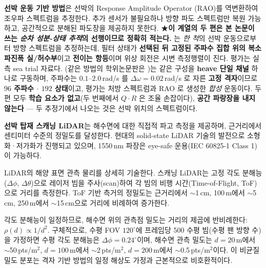 \documentclass[11pt]{report}
\numberwithin{equation}{chapter}
\numberwithin{figure}{chapter}
\numberwithin{table}{chapter}
\begin{document}
\textbf{선박 운동 기반 방법}은 선박의 Response Amplitude Operator (RAO)를
역변환하여 조우파 스펙트럼을 추정한다.
추가 센서가 불필요하나 방향 파도 스펙트럼만 복원 가능하고,
공간적으로 분해된 파도장을 제공하지 못한다.
★\textbf{이 계열의 두 편은 본 논문이 쓰는 \emph{순차 성분-상태 추적}의 선행이므로
정확히 적는다.} \citet{Pascoal2017DirSpectra} 는 \emph{한 척}의 선박 운동으로부터
방향 스펙트럼을 추정하는데, 필터 상태가 \textbf{선택된 뒤 고정된 주파수 집합 위의 복소
파진폭 실/허수부}이고 \textbf{전이는 항등}이며 위상 회전은 시변 측정행렬이 진다.
평가는 실측 sea trial 자료다. \citet{Kim2019InverseKF}(같은 방법의 학위논문판은
\citet{Kim2020Thesis})는 같은 구성을 \textbf{heave 단일 채널} 하나로 구동하며,
주파수는 $0.1$--$2.0$\,rad/s 를 $\Delta\omega = 0.02$\,rad/s 로 자른 \textbf{고정
격자}이므로 \textbf{$96$ 주파수 $\cdot$ $192$ 상태}이고, 평가는 처방 스펙트럼과 RAO 로
생성한 \emph{합성} 운동이다. 두 편 모두 \textbf{학습 요소가 없고}(두 번째에서 $Q\cdot R$
은 조율 손잡이다), \textbf{공간 파랑장을 내지 않는다} --- 두 추정기에서 나오는 것은
선박 위치의 스펙트럼이다.

\textbf{선박 탑재 스캐닝 LiDAR}는 해수면에 대한 직접적 파고 측정을 제공하며,
근거리에서 센티미터 수준의 정밀도를 달성한다.
현대의 solid-state LiDAR 기술의 발전으로 소형화·저가화가 진행되고 있으며,
1550\,nm 파장은 eye-safe 운용(IEC 60825-1 Class 1)이 가능하다.

LiDAR의 해양 표면 관측 물리를 상세히 기술한다.
스캐닝 LiDAR는 고정 각도 분해능($\Delta\phi$, $\Delta\theta$)으로
레이저 빔을 주사(scan)하여 각 빔의 비행 시간(Time-of-Flight, ToF)으로
거리를 측정한다. ToF 기반 측거의 정밀도는 근거리에서 $\sim$1\,cm,
100\,m에서 $\sim$5\,cm, 250\,m에서 $\sim$15\,cm으로 거리에 비례하여 증가한다.

각도 분해능이 일정하므로, 해수면 위의 관측점 밀도는
거리의 제곱에 반비례한다:
$\rho(d) \propto 1/d^2$.
구체적으로, 수평 FOV $120^\circ$에 프레임당 500 수평 빔(수평 팬 방향 수)을 가정하면
수평 각도 분해능은 $\Delta\phi = 0.24^\circ$이며,
해수면 관측 밀도는 $d = 20$\,m에서 $\sim$50\,pts/m$^2$,
$d = 100$\,m에서 $\sim$2\,pts/m$^2$,
$d = 200$\,m에서 $\sim$0.5\,pts/m$^2$이다.
이 비균질 밀도 분포는 격자 기반 방법의 일정 해상도 가정과 근본적으로 비호환적이다.
\end{document}
